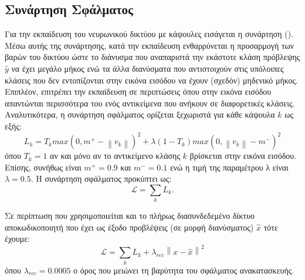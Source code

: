 \subsection{Συνάρτηση Σφάλματος}

Για την εκπαίδευση του νευρωνικού δικτύου με κάψουλες εισάγεται η συνάρτηση  (). Μέσω αυτής της συνάρτησης, κατά την εκπαίδευση ενθαρρύνεται η προσαρμογή των βαρών του δικτύου ώστε το διάνυσμα  που αναπαριστά την εκάστοτε κλάση πρόβλεψης $\hat{y}$ να έχει μεγάλο μήκος ενώ τα άλλα διανύσματα που αντιστοιχούν στις υπόλοιπες κλάσεις που δεν εντοπίζονται στην εικόνα εισόδου να έχουν (σχεδόν) μηδενικό μήκος. Επιπλέον, επιτρέπει την εκπαίδευση σε περιπτώσεις όπου στην εικόνα εισόδου απαντώνται περισσότερα του ενός αντικείμενα που ανήκουν σε διαφορετικές κλάσεις. Αναλυτικότερα, η συνάρτηση σφάλματος ορίζεται ξεχωριστά για κάθε κάψουλα  $k$ ως εξής:
\begin{equation}
    L_k = T_k max(0, m^+ - \left\lVert v_k\right\rVert)^2 + \lambda (1-T_k) max(0, \left\lVert v_k\right\rVert - m^-)^2
\end{equation}
όπου $T_k = 1$ αν και μόνο αν το αντικείμενο κλάσης $k$ βρίσκεται στην εικόνα εισόδου. Επίσης, συνήθως είναι $m^+ = 0.9$ και $m^- = 0.1$ ενώ η τιμή της παραμέτρου λ είναι $\lambda = 0.5$. Η συνάρτηση σφάλματος προκύπτει ως: \begin{equation}
  \mathcal{L} = \sum_k L_k.
\end{equation}

Σε περίπτωση που χρησιμοποιείται και το πλήρως διασυνδεδεμένο δίκτυο αποκωδικοποιητή που έχει ως έξοδο προβλέψεις (σε μορφή διανύσματος) $\hat{x}$ τότε έχουμε: 
\begin{equation}
\mathcal{L} = \sum_k L_k + \lambda_{rec} \left\lVert x - \hat{x}\right\rVert^2 
\end{equation}
όπου $\lambda_{rec} = 0.0005$ ο όρος που μειώνει τη βαρύτητα του σφάλματος ανακατασκευής.


\section{}

